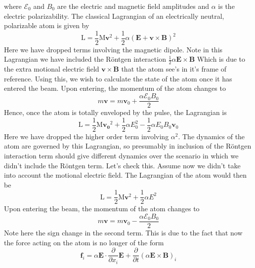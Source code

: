 \documentclass[twocolumn,english,pra,aps,superscriptaddress,floatfix]{revtex4-1}
\begin{document}
where $\mathcal{E}_0$ and $B_0$ are the electric and magnetic field amplitudes and $\alpha$ is the electric polarizability.  The classical Lagrangian of an electrically neutral, polarizable atom is given by \cite{wilkens94}
\begin{equation}
\mathrm{L}=\frac{1}{2}\mathrm{M}\mathbf{v}^2 + \frac{1}{2}\alpha\left(\mathbf{E} +\mathbf{v}\times\mathbf{B}\right)^2
\label{lagrangian3}
\end{equation}
Here we have dropped terms involving the magnetic dipole.  Note in this Lagrangian we have included the R\"{o}ntgen interaction $\frac{1}{2}\alpha \mathbf{E}\times \mathbf{B}$ Which is due to the extra motional electric field $\mathbf{v}\times\mathbf{B}$ that the atom see's in it's frame of reference. Using this, we wish to calculate the state of the atom once it has entered the beam.  Upon entering, the momentum of the atom changes to 
\begin{equation}
m\mathbf{v}=m\mathbf{v}_0+\frac{\alpha\mathcal{E}_0B_0}{2}
\end{equation}
Hence, once the atom is totally enveloped by the pulse, the Lagrangian is
\begin{equation}
\mathrm{L}=\frac{1}{2}\mathrm{M}\mathbf{v_0}^2 + \frac{1}{2}\alpha E_0^2 - \frac{1}{2}\alpha E_0 B_0 \mathbf{v}_0
\label{lagrangian3}
\end{equation}
Here we have dropped the higher order term involving $\alpha ^2$.  The dynamics of the atom are governed by this Lagrangian, so presumably in inclusion of the R\"{o}ntgen interaction term should give different dynamics over the scenario in which we didn't include the R\"{o}ntgen term.  Let's check this.  Assume now we didn't take into account the motional electric field.  The Lagrangian of the atom would then be
\begin{equation}
\mathrm{L}=\frac{1}{2}\mathrm{M}\mathbf{v}^2 + \frac{1}{2}\alpha E^2
\label{lagrangian4}
\end{equation}
Upon entering the beam, the momentum of the atom changes to 
\begin{equation}
m\mathbf{v}=m\mathbf{v}_0-\frac{\alpha\mathcal{E}_0B_0}{2}
\end{equation}
Note here the sign change in the second term.  This is due to the fact that now the force acting on the atom is no longer of the form
\begin{equation}
\mathbf{f}_i= \alpha\mathbf{E}\cdot\frac{\partial}{\partial x_i}\mathbf{E}+\frac{\partial}{\partial t}\left(\alpha\mathbf{E}\times\mathbf{B}\right)_i
\label{lorentz4}
\end{equation}
\end{document}
